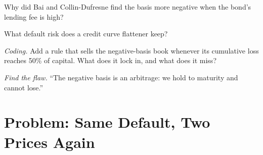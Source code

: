 \begin{exercise}[$\star\star$]\label{exo:s2:credit-relative-value:5}
Why did Bai and Collin-Dufresne find the basis more negative when the bond's lending fee is high?
\end{exercise}

\begin{exercise}[$\star\star$]\label{exo:s2:credit-relative-value:6}
What default risk does a credit curve flattener keep?
\end{exercise}

\begin{exercise}[$\star\star\star$]\label{exo:s2:credit-relative-value:7}
\emph{Coding.} Add a rule that sells the negative-basis book whenever its cumulative loss reaches 50\% of capital. What does it lock in, and what
does it miss?
\end{exercise}

\begin{exercise}[$\star\star\star$]\label{exo:s2:credit-relative-value:8}
\emph{Find the flaw.} ``The negative basis is an arbitrage: we hold to maturity and cannot lose.''
\end{exercise}

\section{Problem: Same Default, Two Prices Again}

